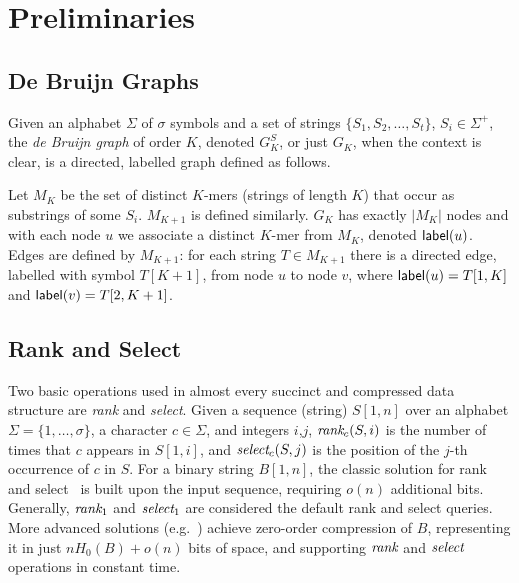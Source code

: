 \section{Preliminaries} \label{sec:preliminaries}

\subsection{De Bruijn Graphs} \label{sec:dbg}

Given an alphabet $\Sigma$ of $\sigma$ symbols and a set of strings $\lbrace
S_1, S_2, \ldots, S_t \rbrace$, $S_i \in \Sigma^{+}$, the {\em de Bruijn graph}
of order $K$, denoted $G^S_K$, or just $G_K$, when the context is clear, is a
directed, labelled graph defined as follows.


Let $M_{K}$ be the set of distinct $K$-mers (strings of length $K$) that occur
as substrings of some $S_i$. $M_{K+1}$ is defined similarly.  $G_K$ has exactly
$|M_{K}|$ nodes and with each node $u$ we associate a distinct $K$-mer from
$M_{K}$, denoted $\mathsf{label}(u)$. Edges are defined by $M_{K+1}$: for each
string $T \in M_{K+1}$ there is a directed edge, labelled with symbol $T[K+1]$,
from node $u$ to node $v$, where $\mathsf{label}(u) = T[1,K]$ and $\mathsf{label}(v) =
T[2,K+1]$. 

\subsection{Rank and Select} \label{sec:rank} Two basic operations used in almost
every succinct and compressed data structure are {\em rank} and {\em select}.
Given a sequence (string) $S[1,n]$ over an alphabet $\Sigma =
\{1,\ldots,\sigma\}$, a character $c \in \Sigma $, and integers $i$,$j$,
$\textit{rank}_c(S,i)$ is the number of times that $c$ appears in $S[1,i]$, and
$\textit{select}_c(S,j)$ is the position of the $j$-th occurrence of $c$ in $S$.
For a binary string $B[1,n]$, the classic solution for rank and
select~\cite{Mun96} is built upon the input sequence, requiring $o(n)$
additional bits.  Generally, $\textit{rank}_1$ and $\textit{select}_1$ are considered the
default rank and select queries.  More advanced solutions
(e.g.~\cite{bitvector}) achieve zero-order compression of $B$,
representing it in just $nH_0(B) + o(n)$ bits of space, and supporting $\textit{rank}$
and $\textit{select}$ operations in constant time. 

